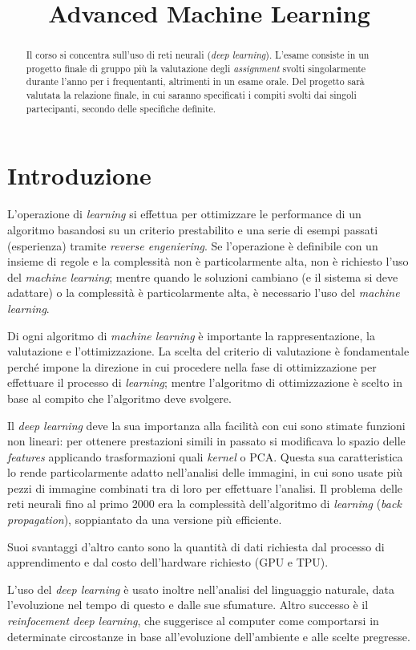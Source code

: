 \documentclass[11pt, a4page]{article}
\title{\textbf{Advanced Machine Learning}}
\author{}
\date{}
\begin{document}
\maketitle
\begin{abstract}
  Il corso si concentra sull'uso di reti neurali (\textit{deep learning}).
  L'esame consiste in un progetto finale di gruppo più la valutazione degli \textit{assignment} svolti singolarmente durante l'anno per i frequentanti, altrimenti in un esame orale.
  Del progetto sarà valutata la relazione finale, in cui saranno specificati i compiti svolti dai singoli partecipanti, secondo delle specifiche definite.
\end{abstract}
\tableofcontents
\newpage

\section{Introduzione}
L'operazione di \textit{learning} si effettua per ottimizzare le performance di un algoritmo basandosi su un criterio prestabilito e una serie di esempi passati (esperienza) tramite \textit{reverse engeniering}.
Se l'operazione è definibile con un insieme di regole e la complessità non è particolarmente alta, non è richiesto l'uso del \textit{machine learning}; mentre quando le soluzioni cambiano (e il sistema si deve adattare) o la complessità è particolarmente alta, è necessario l'uso del \textit{machine learning}.

Di ogni algoritmo di \textit{machine learning} è importante la rappresentazione, la valutazione e l'ottimizzazione.
La scelta del criterio di valutazione è fondamentale perché impone la direzione in cui procedere nella fase di ottimizzazione per effettuare il processo di \textit{learning}; mentre l'algoritmo di ottimizzazione è scelto in base al compito che l'algoritmo deve svolgere. \newline

Il \textit{deep learning} deve la sua importanza alla facilità con cui sono stimate funzioni non lineari: per ottenere prestazioni simili in passato si modificava lo spazio delle \textit{features} applicando trasformazioni quali \textit{kernel} o PCA.
Questa sua caratteristica lo rende particolarmente adatto nell'analisi delle immagini, in cui sono usate più pezzi di immagine combinati tra di loro per effettuare l'analisi.
Il problema delle reti neurali fino al primo 2000 era la complessità dell'algoritmo di \textit{learning} (\textit{back propagation}), soppiantato da una versione più efficiente.

Suoi svantaggi d'altro canto sono la quantità di dati richiesta dal processo di apprendimento e dal costo dell'hardware richiesto (GPU e TPU).

L'uso del \textit{deep learning} è usato inoltre nell'analisi del linguaggio naturale, data l'evoluzione nel tempo di questo e dalle sue sfumature.
Altro successo è il \textit{reinfocement deep learning}, che suggerisce al computer come comportarsi in determinate circostanze in base all'evoluzione dell'ambiente e alle scelte pregresse.
\end{document}
